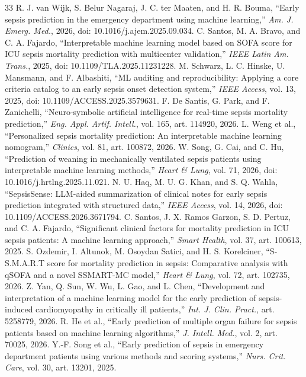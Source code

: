 \documentclass[conference]{IEEEtran}
\begin{document}
\begin{thebibliography}{33}
 R. J. van Wijk, S. Belur Nagaraj, J. C. ter Maaten, and H. R. Bouma, ``Early sepsis prediction in the emergency department using machine learning,'' \emph{Am. J. Emerg. Med.}, 2026, doi: 10.1016/j.ajem.2025.09.034.
 C. Santos, M. A. Bravo, and C. A. Fajardo, ``Interpretable machine learning model based on SOFA score for ICU sepsis mortality prediction with multicenter validation,'' \emph{IEEE Latin Am. Trans.}, 2025, doi: 10.1109/TLA.2025.11231228.
 M. Schwarz, L. C. Hinske, U. Mansmann, and F. Albashiti, ``ML auditing and reproducibility: Applying a core criteria catalog to an early sepsis onset detection system,'' \emph{IEEE Access}, vol. 13, 2025, doi: 10.1109/ACCESS.2025.3579631.
 F. De Santis, G. Park, and F. Zanichelli, ``Neuro-symbolic artificial intelligence for real-time sepsis mortality prediction,'' \emph{Eng. Appl. Artif. Intell.}, vol. 165, art. 114920, 2026.
 L. Weng et al., ``Personalized sepsis mortality prediction: An interpretable machine learning nomogram,'' \emph{Clinics}, vol. 81, art. 100872, 2026.
 W. Song, G. Cai, and C. Hu, ``Prediction of weaning in mechanically ventilated sepsis patients using interpretable machine learning methods,'' \emph{Heart \& Lung}, vol. 71, 2026, doi: 10.1016/j.hrtlng.2025.11.021.
 N. U. Haq, M. U. G. Khan, and S. Q. Wahla, ``SepsisSense: LLM-aided summarization of clinical notes for early sepsis prediction integrated with structured data,'' \emph{IEEE Access}, vol. 14, 2026, doi: 10.1109/ACCESS.2026.3671794.
 C. Santos, J. X. Ramos Garzon, S. D. Pertuz, and C. A. Fajardo, ``Significant clinical factors for mortality prediction in ICU sepsis patients: A machine learning approach,'' \emph{Smart Health}, vol. 37, art. 100613, 2025.
 S. Ozdemir, I. Altunok, M. Osoydan Satici, and H. S. Korelciner, ``S-S.M.A.R.T score for mortality prediction in sepsis: Comparative analysis with qSOFA and a novel SSMART-MC model,'' \emph{Heart \& Lung}, vol. 72, art. 102735, 2026.
 Z. Yan, Q. Sun, W. Wu, L. Gao, and L. Chen, ``Development and interpretation of a machine learning model for the early prediction of sepsis-induced cardiomyopathy in critically ill patients,'' \emph{Int. J. Clin. Pract.}, art. 5258779, 2026.
 R. He et al., ``Early prediction of multiple organ failure for sepsis patients based on machine learning algorithms,'' \emph{J. Intell. Med.}, vol. 2, art. 70025, 2026.
 Y.-F. Song et al., ``Early prediction of sepsis in emergency department patients using various methods and scoring systems,'' \emph{Nurs. Crit. Care}, vol. 30, art. 13201, 2025.

\end{thebibliography}
\end{document}
